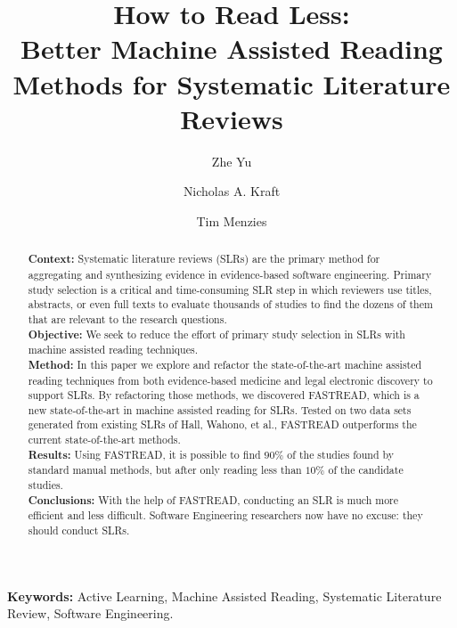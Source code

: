 \documentclass[final,twocolumn,5p]{elsarticle}
\theoremstyle{break}
\begin{document}

\begin{frontmatter}
  \title{ How to Read Less:\\ Better Machine Assisted Reading Methods for Systematic Literature Reviews}
\author[add1]{Zhe Yu}
\author[add2]{Nicholas A. Kraft}
\author[add1]{Tim Menzies}
\address[add1]{Department of Computer Science, North Carolina State University, Raleigh, NC, USA}
\address[add2]{ABB Corporate Research, Raleigh, NC, USA}


\begin{abstract}
  
\noindent\textbf{Context:} Systematic literature reviews (SLRs) are the primary method for aggregating and synthesizing evidence in evidence-based software engineering. Primary study selection is a critical and time-consuming SLR step in which reviewers use
titles, abstracts, or even full texts to evaluate thousands of studies to find
the dozens of them that are relevant to the research questions. \\
\textbf{Objective:} We seek to reduce the effort of primary study selection in SLRs with machine assisted reading techniques.\\
\textbf{Method:} In this paper we explore and refactor the state-of-the-art machine assisted reading techniques from both evidence-based medicine and legal electronic discovery to support SLRs. By refactoring those methods, we discovered FASTREAD, which is a new state-of-the-art in machine assisted reading for SLRs. Tested on two data sets generated from existing SLRs of Hall, Wahono, et al., FASTREAD outperforms the current state-of-the-art methods.\\
\textbf{Results:} Using FASTREAD, it is possible to find $90\%$ of the studies found by standard manual methods, but after only reading less than $10\%$ of the candidate studies. \\
\textbf{Conclusions:} With the help of FASTREAD, conducting an SLR is much more
efficient and less difficult. Software Engineering researchers now have no excuse: they should conduct SLRs.

\end{abstract}
\end{frontmatter}


 
\vspace{1mm}
\noindent
{\bf Keywords:} Active Learning, Machine Assisted Reading, Systematic Literature Review, Software Engineering.
\end{document}
